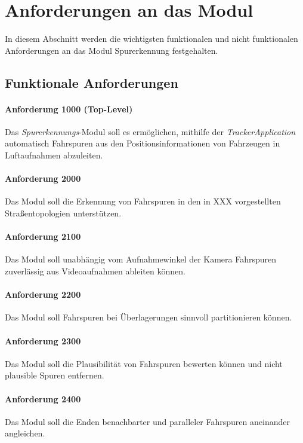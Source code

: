 \section{Anforderungen an das Modul}
\label{sec:requirements}

In diesem Abschnitt werden die wichtigsten funktionalen und nicht funktionalen Anforderungen
an das Modul Spurerkennung festgehalten.

\subsection{Funktionale Anforderungen}

\paragraph{Anforderung 1000 (Top-Level)}
Das \textit{Spurerkennungs}-Modul soll es ermöglichen, mithilfe der \textit{TrackerApplication}
automatisch Fahrspuren aus den Positionsinformationen von Fahrzeugen in Luftaufnahmen abzuleiten.

\paragraph{Anforderung 2000}
Das Modul soll die Erkennung von Fahrspuren in den in XXX vorgestellten
Straßentopologien unterstützen.

\paragraph{Anforderung 2100}
Das Modul soll unabhängig vom Aufnahmewinkel der Kamera Fahrspuren zuverlässig aus Videoaufnahmen ableiten können. 

\paragraph{Anforderung 2200}
Das Modul soll Fahrspuren bei Überlagerungen sinnvoll partitionieren können.

\paragraph{Anforderung 2300}
Das Modul soll die Plausibilität von Fahrspuren bewerten können und nicht plausible Spuren entfernen.

\paragraph{Anforderung 2400}
Das Modul soll die Enden benachbarter und paralleler Fahrspuren aneinander angleichen. 

